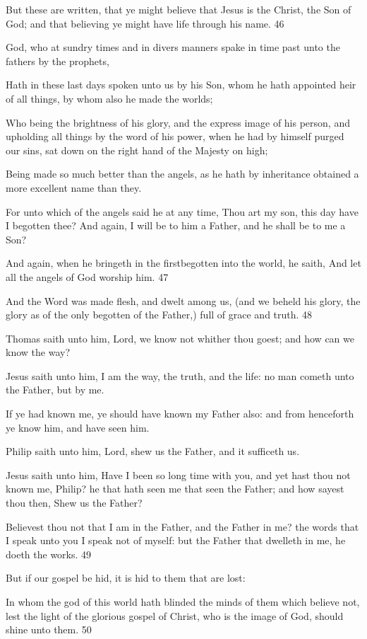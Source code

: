 But these are written, that ye might believe that Jesus is the Christ, the Son of God; and that
believing ye might have life through his name. 46

God, who at sundry times and in divers manners spake in time past unto the fathers by the
prophets,

Hath in these last days spoken unto us by his Son, whom he hath appointed heir of all things,
by whom also he made the worlds;

Who being the brightness of his glory, and the express image of his person, and upholding all
things by the word of his power, when he had by himself purged our sins, sat down on the
right hand of the Majesty on high;

Being made so much better than the angels, as he hath by inheritance obtained a more
excellent name than they.

For unto which of the angels said he at any time, Thou art my son, this day have I begotten
thee? And again, I will be to him a Father, and he shall be to me a Son?

And again, when he bringeth in the firstbegotten into the world, he saith, And let all the
angels of God worship him. 47

And the Word was made flesh, and dwelt among us, (and we beheld his glory, the glory as of
the only begotten of the Father,) full of grace and truth. 48

Thomas saith unto him, Lord, we know not whither thou goest; and how can we know the
way?

Jesus saith unto him, I am the way, the truth, and the life: no man cometh unto the Father, but
by me.

If ye had known me, ye should have known my Father also: and from henceforth ye know
him, and have seen him.

Philip saith unto him, Lord, shew us the Father, and it sufficeth us.

Jesus saith unto him, Have I been so long time with you, and yet hast thou not known me,
Philip? he that hath seen me that seen the Father; and how sayest thou then, Shew us the
Father?

Believest thou not that I am in the Father, and the Father in me? the words that I speak unto
you I speak not of myself: but the Father that dwelleth in me, he doeth the works. 49

But if our gospel be hid, it is hid to them that are lost:

In whom the god of this world hath blinded the minds of them which believe not, lest the
light of the glorious gospel of Christ, who is the image of God, should shine unto them. 50

